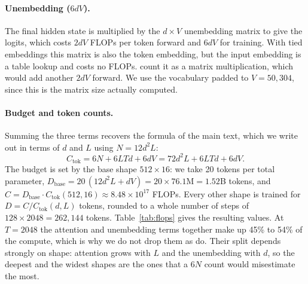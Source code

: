 \documentclass[10pt,twocolumn,a4paper]{article}
\newcommand{\sh}[2]{\ensuremath{#1{\times}#2}}  %
\begin{document}
\paragraph{Unembedding ($6dV$).} The final hidden state is multiplied by the $d \times V$ unembedding matrix to give the logits, which costs $2dV$ FLOPs per token forward and $6dV$ for training. With tied embeddings this matrix is also the token embedding, but the input embedding is a table lookup and costs no FLOPs. \citet{hoffmann2022training} count it as a matrix multiplication, which would add another $2dV$ forward. We use the vocabulary padded to $V = 50{,}304$, since this is the matrix size actually computed.

\paragraph{Budget and token counts.} Summing the three terms recovers the formula of the main text, which we write out in terms of $d$ and $L$ using $N = 12d^2L$:
\[
    C_\text{tok} = 6N + 6LTd + 6dV = 72 d^2 L + 6LTd + 6dV .
\]
The budget is set by the base shape \sh{512}{16}: we take 20 tokens per total parameter, $D_\text{base} = 20\,(12 d^2 L + dV) = 20 \times 76.1\text{M} = 1.52$B tokens, and $C = D_\text{base} \cdot C_\text{tok}(512, 16) \approx 8.48 \times 10^{17}$ FLOPs. Every other shape is trained for $D = C / C_\text{tok}(d, L)$ tokens, rounded to a whole number of steps of $128 \times 2048 = 262{,}144$ tokens. Table~\ref{tab:flops} gives the resulting values. At $T = 2048$ the attention and unembedding terms together make up 45\% to 54\% of the compute, which is why we do not drop them as \citeauthor{kaplan2020scaling} do. Their split depends strongly on shape: attention grows with $L$ and the unembedding with $d$, so the deepest and the widest shapes are the ones that a $6N$ count would misestimate the most.
\end{document}
